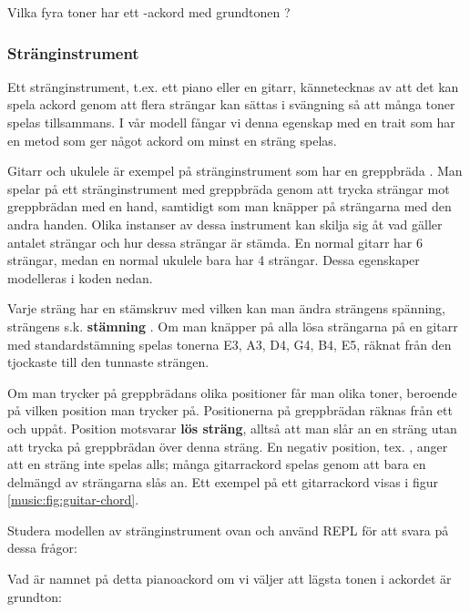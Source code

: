 \Subtask Vilka fyra toner har ett -ackord med grundtonen ?

\subsubsection{Stränginstrument}

Ett stränginstrument, t.ex. ett piano eller en gitarr, kännetecknas av att det kan spela ackord genom att flera strängar kan sättas i svängning så att många toner spelas tillsammans. I vår modell fångar vi denna egenskap med en trait  som har en metod  som ger något ackord om minst en sträng spelas.

Gitarr och ukulele är exempel på stränginstrument som har en greppbräda . Man spelar på ett stränginstrument med greppbräda  genom att trycka strängar mot greppbrädan med en hand, samtidigt som man knäpper på strängarna med den andra handen. Olika instanser av dessa  instrument kan skilja sig åt vad gäller antalet strängar och hur dessa strängar är stämda. En normal gitarr har 6 strängar, medan en normal ukulele bara har 4 strängar. Dessa egenskaper modelleras i koden nedan.

Varje sträng har en stämskruv med vilken kan man ändra strängens spänning,  strängens s.k. \textbf{stämning} .  Om man knäpper på alla lösa strängarna på en gitarr med standardstämning spelas tonerna E3, A3, D4, G4, B4, E5, räknat från den tjockaste till den tunnaste strängen.


Om man trycker på greppbrädans olika positioner får man olika toner, beroende på vilken position man trycker på. Positionerna på greppbrädan räknas från ett och uppåt. Position  motsvarar \textbf{lös sträng}, alltså att man slår an en sträng utan att trycka på greppbrädan över denna sträng. En negativ position, tex. , anger att en sträng inte spelas alls; många gitarrackord spelas genom att bara en delmängd av strängarna slås an.
Ett exempel på ett gitarrackord  visas i figur \ref{music:fig:guitar-chord}.

\Task\Pen Studera modellen av stränginstrument ovan och använd REPL för att svara på dessa frågor:

\Subtask Vad är namnet på detta pianoackord om vi väljer att lägsta tonen i ackordet är grundton: 

